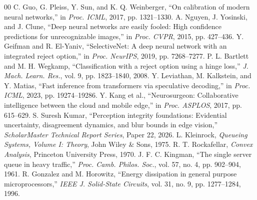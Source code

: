 \documentclass[conference]{IEEEtran}
\begin{document}
\begin{thebibliography}{00}
 C. Guo, G. Pleiss, Y. Sun, and K. Q. Weinberger, ``On calibration of modern neural networks,'' in \emph{Proc. ICML}, 2017, pp. 1321--1330.
 A. Nguyen, J. Yosinski, and J. Clune, ``Deep neural networks are easily fooled: High confidence predictions for unrecognizable images,'' in \emph{Proc. CVPR}, 2015, pp. 427--436.
 Y. Geifman and R. El-Yaniv, ``SelectiveNet: A deep neural network with an integrated reject option,'' in \emph{Proc. NeurIPS}, 2019, pp. 7268--7277.
 P. L. Bartlett and M. H. Wegkamp, ``Classification with a reject option using a hinge loss,'' \emph{J. Mach. Learn. Res.}, vol. 9, pp. 1823--1840, 2008.
 Y. Leviathan, M. Kalkstein, and Y. Matias, ``Fast inference from transformers via speculative decoding,'' in \emph{Proc. ICML}, 2023, pp. 19274--19286.
 Y. Kang et al., ``Neurosurgeon: Collaborative intelligence between the cloud and mobile edge,'' in \emph{Proc. ASPLOS}, 2017, pp. 615--629.
 S. Suresh Kumar, ``Perception integrity foundations: Evidential uncertainty, disagreement dynamics, and blur bounds in edge vision,'' \emph{ScholarMaster Technical Report Series}, Paper 22, 2026.
 L. Kleinrock, \emph{Queueing Systems, Volume I: Theory}, John Wiley \& Sons, 1975.
 R. T. Rockafellar, \emph{Convex Analysis}, Princeton University Press, 1970.
 J. F. C. Kingman, ``The single server queue in heavy traffic,'' \emph{Proc. Camb. Philos. Soc.}, vol. 57, no. 4, pp. 902--904, 1961.
 R. Gonzalez and M. Horowitz, ``Energy dissipation in general purpose microprocessors,'' \emph{IEEE J. Solid-State Circuits}, vol. 31, no. 9, pp. 1277--1284, 1996.
\end{thebibliography}
\end{document}
